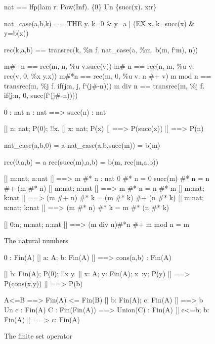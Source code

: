 \begin{figure}
\begin{ttbox}
       nat == lfp(lam r: Pow(Inf). \{0\} Un \{succ(x). x:r\}

  nat_case(a,b,k) == 
              THE y. k=0 & y=a | (EX x. k=succ(x) & y=b(x))

       rec(k,a,b) ==  
              transrec(k, \%n f. nat_case(a, \%m. b(m, f`m), n))

       m#+n == rec(m, n, \%u v.succ(v))
      m#-n == rec(n, m, \%u v. rec(v, 0, \%x y.x))
      m#*n == rec(m, 0, \%u v. n #+ v)
       m mod n == transrec(m, \%j f. if(j:n, j, f`(j#-n)))
       m div n == transrec(m, \%j f. if(j:n, 0, succ(f`(j#-n))))

        0 : nat
     n : nat ==> succ(n) : nat

    [| n: nat;  P(0);  !!x. [| x: nat;  P(x) |] ==> P(succ(x)) 
    |] ==> P(n)

    nat_case(a,b,0) = a
 nat_case(a,b,succ(m)) = b(m)

         rec(0,a,b) = a
      rec(succ(m),a,b) = b(m, rec(m,a,b))

     [| m:nat;  n:nat |] ==> m #* n : nat
        0 #* n = 0
     succ(m) #* n = n #+ (m #* n)
  [| m:nat;  n:nat |] ==> m #* n = n #* m
    [| m:nat;  k:nat |] ==> (m #+ n) #* k = (m #* k) #+ (n #* k)
    [| m:nat;  n:nat;  k:nat |] ==> (m #* n) #* k = m #* (n #* k)

    [| 0:n;  m:nat;  n:nat |] ==> (m div n)#*n #+ m mod n = m
\end{ttbox}
\caption{The natural numbers} \label{zf-nat}
\end{figure}

\begin{figure}
\begin{ttbox}
          0 : Fin(A)
       [| a: A;  b: Fin(A) |] ==> cons(a,b) : Fin(A)

    [| b: Fin(A);
       P(0);
       !!x y. [| x: A;  y: Fin(A);  x~:y;  P(y) |] ==> P(cons(x,y))
    |] ==> P(b)

        A<=B ==> Fin(A) <= Fin(B)
         [| b: Fin(A);  c: Fin(A) |] ==> b Un c : Fin(A)
      C : Fin(Fin(A)) ==> Union(C) : Fin(A)
      [| c<=b;  b: Fin(A) |] ==> c: Fin(A)
\end{ttbox}
\caption{The finite set operator} \label{zf-fin}
\end{figure}


